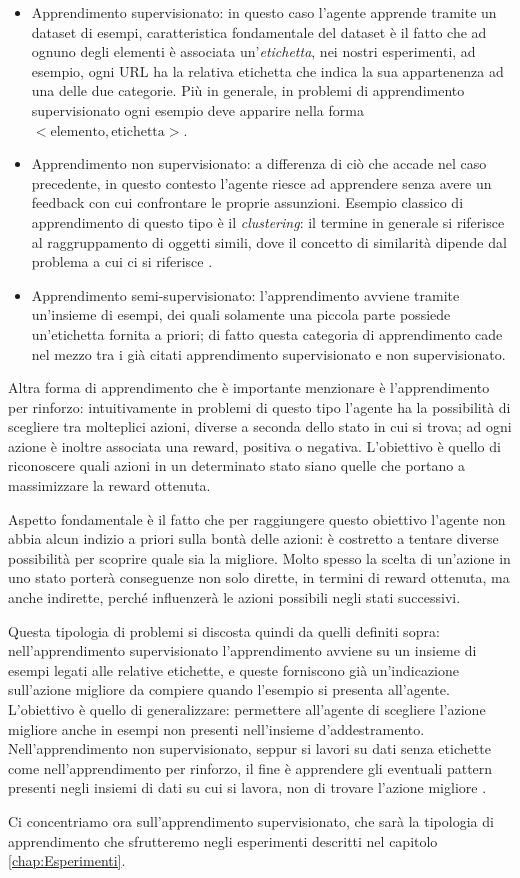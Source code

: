 \documentclass[../../main.tex]{subfiles}
\begin{document}
    \begin{itemize}
        \item Apprendimento supervisionato: in questo caso l'agente apprende tramite un dataset di esempi, caratteristica fondamentale del dataset è il fatto che ad ognuno degli elementi è associata un'\textit{etichetta}, nei nostri esperimenti, ad esempio, ogni URL ha la relativa etichetta che indica la sua appartenenza ad  una delle due categorie. Più in generale, in problemi di apprendimento supervisionato ogni esempio deve apparire nella forma $ <\text{elemento}, \text{etichetta}> $.
        \item Apprendimento non supervisionato: a differenza di ciò che accade nel caso precedente, in questo contesto l'agente riesce ad apprendere senza avere un feedback con cui confrontare le proprie assunzioni. Esempio classico di apprendimento di questo tipo è il \textit{clustering}: il termine in generale si riferisce al raggruppamento di oggetti simili, dove il concetto di similarità dipende dal problema a cui ci si riferisce \cite{goodfellow2016deep}.
        \item Apprendimento semi-supervisionato: l'apprendimento avviene tramite un'insieme di esempi, dei quali solamente una piccola parte possiede un'etichetta fornita a priori; di fatto questa categoria di apprendimento cade nel mezzo tra i già citati apprendimento supervisionato e non supervisionato.
    \end{itemize}

    Altra forma di apprendimento che è importante menzionare è l'apprendimento per rinforzo: intuitivamente in problemi di questo tipo l'agente ha la possibilità di scegliere tra molteplici azioni, diverse a seconda dello stato in cui si trova; ad ogni azione è inoltre associata una reward, positiva o negativa. L'obiettivo è quello di riconoscere quali azioni in un determinato stato siano quelle che portano a massimizzare la reward ottenuta.

    Aspetto fondamentale è il fatto che per raggiungere questo obiettivo l'agente non abbia alcun indizio a priori sulla bontà delle azioni: è costretto a tentare diverse possibilità per scoprire quale sia la migliore. Molto spesso la scelta di un'azione in uno stato porterà conseguenze non solo dirette, in termini di reward ottenuta, ma anche indirette, perché influenzerà le azioni possibili negli stati successivi.

    Questa tipologia di problemi si discosta quindi da quelli definiti sopra: nell'apprendimento supervisionato l'apprendimento avviene su un insieme di esempi legati alle relative etichette, e queste forniscono già un'indicazione sull'azione migliore da compiere quando l'esempio si presenta all'agente. L'obiettivo è quello di generalizzare: permettere all'agente di scegliere l'azione migliore anche in esempi non presenti nell'insieme d'addestramento.\\
    Nell'apprendimento non supervisionato, seppur si lavori su dati senza etichette come nell'apprendimento per rinforzo, il fine è apprendere gli eventuali pattern presenti negli insiemi di dati su cui si lavora, non di trovare l'azione migliore \cite{Sutton1998}. 

    Ci concentriamo ora sull'apprendimento supervisionato, che sarà la tipologia di apprendimento che sfrutteremo negli esperimenti descritti nel capitolo \ref{chap:Esperimenti}.
    
\end{document}
